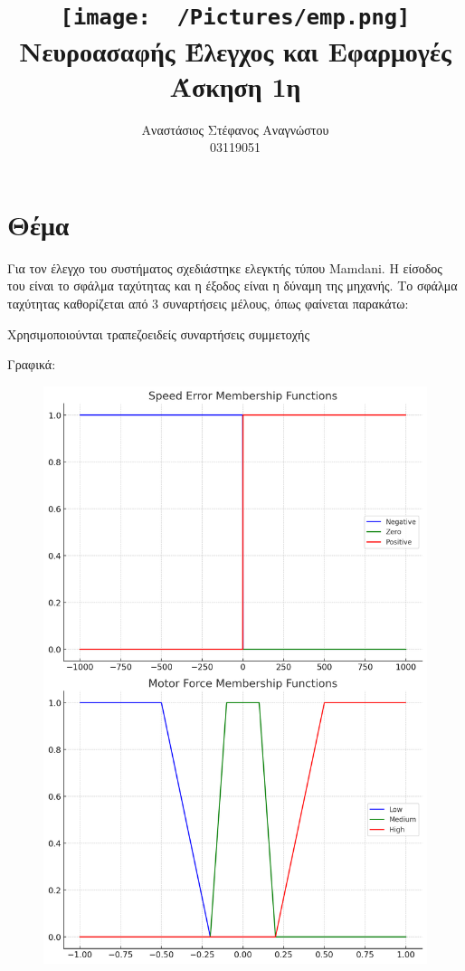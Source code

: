 \documentclass{article}
\title{
    \texttt{[image: ~/Pictures/emp.png]} \\
    \vskip 5cm
    Νευροασαφής Έλεγχος και Εφαρμογές\\
    \large Άσκηση 1η
    \vskip 5cm
}
\author{Αναστάσιος Στέφανος Αναγνώστου\\
        03119051}
\newcommand{\eng}[1]{\foreignlanguage{english}{#1}} %
\begin{document}
\maketitle
\newpage
\tableofcontents
\newpage

\section{Θέμα}

Για τον έλεγχο του συστήματος σχεδιάστηκε ελεγκτής τύπου \eng{Mamdani}. Η
είσοδος του είναι το σφάλμα ταχύτητας και η έξοδος είναι η δύναμη της μηχανής.
Το σφάλμα ταχύτητας καθορίζεται από 3 συναρτήσεις μέλους, όπως φαίνεται παρακάτω:

 

Χρησιμοποιούνται τραπεζοειδείς συναρτήσεις συμμετοχής

 

Γραφικά:

\begin{figure}[h]
    \centering
    \includegraphics[width=0.9\linewidth]{speed-error-memb.png}
\end{figure}
\end{document}
